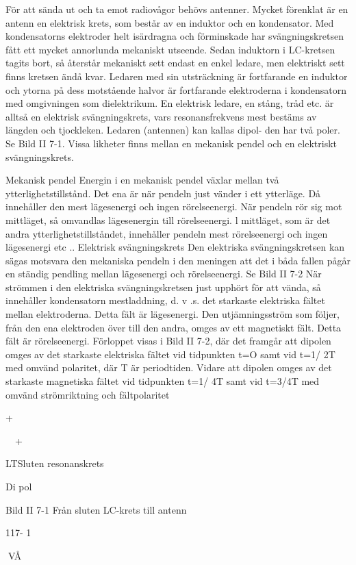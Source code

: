 \documentclass[a4paper,twoside,twocolumn,openright]{book}
\begin{document}
{{{{{{För att sända ut och ta emot radiovågor
behövs antenner. Mycket förenklat är en
antenn en elektrisk krets, som består av en
induktor och en kondensator.
Med kondensatorns elektroder helt isärdragna och förminskade har svängningskretsen fått ett mycket annorlunda mekaniskt utseende. Sedan induktorn i LC-kretsen tagits bort, så återstår mekaniskt sett
endast en enkel ledare, men elektriskt sett
finns kretsen ändå kvar. Ledaren med sin
utsträckning är fortfarande en induktor och
ytorna på dess motstående halvor är fortfarande elektroderna i kondensatorn med omgivningen som dielektrikum.
En elektrisk ledare, en stång, tråd etc. är
alltså en elektrisk svängningskrets, vars resonansfrekvens mest bestäms av längden
och tjockleken. Ledaren (antennen) kan kallas dipol- den har två poler. Se Bild II 7-1.
Vissa likheter finns mellan en mekanisk
pendel och en elektriskt svängningskrets.

Mekanisk pendel
Energin i en mekanisk pendel växlar mellan
två ytterlighetstillstånd. Det ena är när pendeln just vänder i ett ytterläge. Då innehåller
den mest lägesenergi och ingen rörelseenergi. När pendeln rör sig mot mittläget, så
omvandlas lägesenergin till rörelseenergi. l
mittläget, som är det andra ytterlighetstillståndet, innehåller pendeln mest rörelseenergi och ingen lägesenergi etc ..
Elektrisk svängningskrets
Den elektriska svängningskretsen kan sägas motsvara den mekaniska pendeln i den
meningen att det i båda fallen pågår en
ständig pendling mellan lägesenergi och rörelseenergi. Se Bild II 7-2
När strömmen i den elektriska svängningskretsen just upphört för att vända, så
innehåller kondensatorn mestladdning, d. v .s.
det starkaste elektriska fältet mellan elektroderna. Detta fält är lägesenergi. Den utjämningsström som följer, från den ena elektroden över till den andra, omges av ett
magnetiskt fält. Detta fält är rörelseenergi.
Förloppet visas i Bild II 7-2, där det framgår att dipolen omges av det starkaste elektriska fältet vid tidpunkten t=O samt vid t=1/
2T med omvänd polaritet, där T är periodtiden. Vidare att dipolen omges av det starkaste magnetiska fältet vid tidpunkten t=1/
4T samt vid t=3/4T med omvänd strömriktning och fältpolaritet

+

~~+

LTSluten
resonanskrets

Di pol

Bild II 7-1 Från sluten LC-krets till antenn

117- 1

VÅ

}}}}}}
\end{document}
